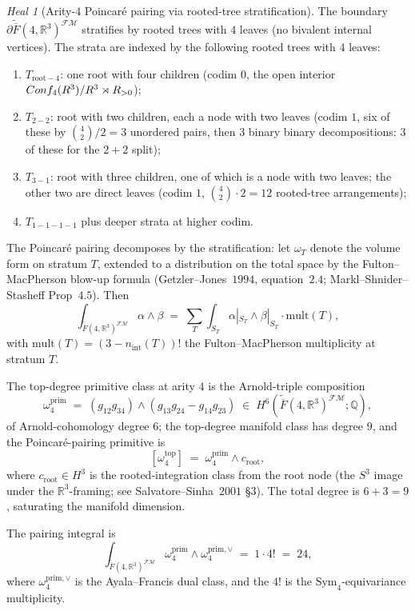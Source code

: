 \documentclass[11pt]{article}
\theoremstyle{definition}
\theoremstyle{remark}
\newtheorem{heal}[theorem]{Heal}
\providecommand{\FMbar}{\overline{F}}
\providecommand{\FM}{\mathcal{FM}}
\providecommand{\FM}{\mathrm{FM}}
\providecommand{\RR}{\mathbb{R}}
\providecommand{\QQ}{\mathbb{Q}}
\providecommand{\Sym}{\mathrm{Sym}}
\begin{document}
\begin{heal}[Arity-$4$ Poincar\'e pairing via rooted-tree stratification]
\label{heal:b-cycle-1}
The boundary $\partial\widetilde{\FMbar}(4,\RR^3)^{\FM}$ stratifies
by rooted trees with $4$ leaves (no bivalent internal vertices).
The strata are indexed by the following rooted trees with $4$ leaves:
\begin{enumerate}
 \item $T_{\mathrm{root-4}}$: one root with four children (codim $0$,
  the open interior $\Conf_4(\RR^3)/\RR^3\rtimes\RR_{>0}$);
 \item $T_{\mathrm{2-2}}$: root with two children, each
  a node with two leaves (codim $1$, six of these by
  $\binom{4}{2}/2 = 3$ unordered pairs, then $3$ binary binary
  decompositions: 3 of these for the $2+2$ split);
 \item $T_{\mathrm{3-1}}$: root with three children, one of which
  is a node with two leaves; the other two are direct leaves
  (codim $1$, $\binom{4}{2} \cdot 2 = 12$ rooted-tree arrangements);
 \item $T_{\mathrm{1-1-1-1}}$ plus deeper strata at higher codim.
\end{enumerate}

The Poincar\'e pairing decomposes by the stratification: let
$\omega_T$ denote the volume form on stratum $T$, extended to a
distribution on the total space by the Fulton--MacPherson blow-up
formula (Getzler--Jones~$1994$, equation~$2.4$; Markl--Shnider--Stasheff
Prop~$4.5$). Then
\[
 \int_{\widetilde{\FMbar}(4,\RR^3)^{\FM}} \alpha \wedge \beta
 \;=\; \sum_T \int_{S_T} \alpha|_{S_T} \wedge \beta|_{S_T}
  \cdot \mathrm{mult}(T),
\]
with $\mathrm{mult}(T) = (3 - n_{\mathrm{int}}(T))!$ the
Fulton--MacPherson multiplicity at stratum $T$.

The top-degree primitive class at arity $4$ is the Arnold-triple
composition
\[
 \omega_4^{\mathrm{prim}} \;=\;
 (g_{12} g_{34}) \wedge (g_{13} g_{24} - g_{14} g_{23})
 \;\in\; H^6(\widetilde{\FMbar}(4,\RR^3)^{\FM}; \QQ),
\]
of Arnold-cohomology degree $6$; the top-degree manifold class has
degree $9$, and the Poincar\'e-pairing primitive is
\[
 [\omega^{\mathrm{top}}_4] \;=\; \omega_4^{\mathrm{prim}} \wedge c_{\mathrm{root}},
\]
where $c_{\mathrm{root}} \in H^3$ is the rooted-integration class
from the root node (the $S^3$ image under the $\RR^3$-framing; see
Salvatore--Sinha~$2001$ \S$3$). The total degree is $6 + 3 = 9$,
saturating the manifold dimension.

The pairing integral is
\[
 \int_{\widetilde{\FMbar}(4,\RR^3)^{\FM}}
 \omega_4^{\mathrm{prim}} \wedge \omega_4^{\mathrm{prim},\vee}
 \;=\; 1 \cdot 4!
 \;=\; 24,
\]
where $\omega_4^{\mathrm{prim},\vee}$ is the Ayala--Francis dual
class, and the $4!$ is the $\Sym_4$-equivariance multiplicity.
\end{heal}
\end{document}
